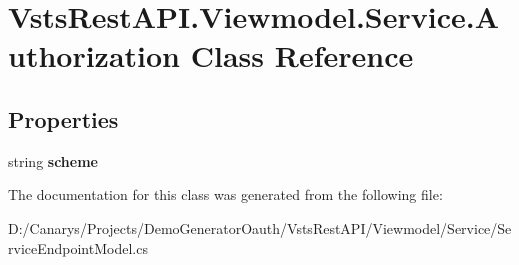 \hypertarget{class_vsts_rest_a_p_i_1_1_viewmodel_1_1_service_1_1_authorization}{}\section{Vsts\+Rest\+A\+P\+I.\+Viewmodel.\+Service.\+Authorization Class Reference}
\label{class_vsts_rest_a_p_i_1_1_viewmodel_1_1_service_1_1_authorization}
\subsection*{Properties}
\begin{DoxyCompactItemize}
\item 
\mbox{\label{class_vsts_rest_a_p_i_1_1_viewmodel_1_1_service_1_1_authorization_a95ffbc7b2477e40057768b43a8803662}} 
string {\bfseries scheme}
\end{DoxyCompactItemize}


The documentation for this class was generated from the following file\+:\begin{DoxyCompactItemize}
\item 
D\+:/\+Canarys/\+Projects/\+Demo\+Generator\+Oauth/\+Vsts\+Rest\+A\+P\+I/\+Viewmodel/\+Service/Service\+Endpoint\+Model.\+cs\end{DoxyCompactItemize}
